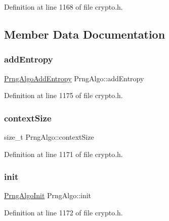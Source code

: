 Definition at line 1168 of file crypto.\+h.



\subsection{Member Data Documentation}
\mbox{\label{structPrngAlgo_ac77eb291fb759f30bbeccf320648dc45}} 
\subsubsection{\texorpdfstring{add\+Entropy}{addEntropy}}
{\footnotesize\ttfamily \hyperlink{cyclone__crypto_2core_2crypto_8h_a7a1131568c9968297240a339611528b6}{Prng\+Algo\+Add\+Entropy} Prng\+Algo\+::add\+Entropy}



Definition at line 1175 of file crypto.\+h.

\mbox{\label{structPrngAlgo_afa5f00aea3bcb893e569a5b2b17cacff}} 
\subsubsection{\texorpdfstring{context\+Size}{contextSize}}
{\footnotesize\ttfamily size\+\_\+t Prng\+Algo\+::context\+Size}



Definition at line 1171 of file crypto.\+h.

\mbox{\label{structPrngAlgo_a236d51b2333e3ec0cfdd1e69b5b16d8b}} 
\subsubsection{\texorpdfstring{init}{init}}
{\footnotesize\ttfamily \hyperlink{cyclone__crypto_2core_2crypto_8h_ab49454c4c68dfc5734a75010fbc7ec50}{Prng\+Algo\+Init} Prng\+Algo\+::init}



Definition at line 1172 of file crypto.\+h.

\mbox{\label{structPrngAlgo_a356764e8ce05dcc4ebe9fc09ec51f4a7}} 
